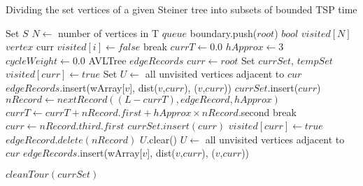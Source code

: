 \begin{algorithm}
\caption{Dividing the set vertices of a given Steiner tree into subsets of bounded TSP time}\label{euclid2}
\begin{algorithmic}
\State Set  $S$
\State $N \gets$ number of vertices in T
\State $queue$ boundary.push($root$) 
\State $bool$ $visited[N]$
\State $vertex$ curr 
	\State $visited[i] \gets false$ 
\EndFor
{}
		\State break
	\EndIf
	\State $currT \gets 0.0$ 
	\State $hApprox \gets 3$ 
	\State $cycleWeight \gets 0.0$ 
	\State AVLTree $edgeRecords$  
	\State $curr \gets root$ 
	\State Set $currSet$, $tempSet$ 
	\State $visited[curr] \gets true$ 
	\State Set $U \gets$ all unvisited vertices adjacent to $cur$ 
		\State $edgeRecords$.insert(wArray[$v$], dist($v$,$curr$), ($v$,$curr$)) 
	\EndFor
	\State $currSet$.insert($curr$) 
		\State $nRecord \gets nextRecord((L-currT),edgeRecord,hApprox)$
		\State $currT \gets currT + nRecord.first + hApprox \times nRecord$.second 
			break 
		\EndIf
		\State $curr \gets nRecord.third.first$
		\State $currSet.insert(curr)$ 
		\State $visited[curr] \gets true$ 
		\State $edgeRecord.delete(nRecord)$
		\State $U$.clear() 
		\State $U \gets$ all unvisited vertices adjacent to $cur$ 
			\State $edgeRecords$.insert(wArray[$v$], dist($v$,$curr$), ($v$,$curr$)) 
		\EndFor
	\EndWhile
	
	\State $cleanTour(currSet)$
	
\end{algorithmic}
\end{algorithm}

